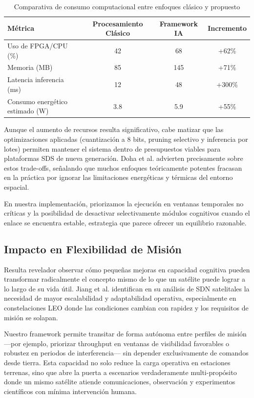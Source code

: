 \begin{table}[h]
\centering
\caption{Comparativa de consumo computacional entre enfoques clásico y propuesto}
\label{tab:consumo_computacional}
\begin{tabular}{lccc}
\hline
\textbf{Métrica} & \textbf{Procesamiento Clásico} & \textbf{Framework IA} & \textbf{Incremento} \\
\hline
Uso de FPGA/CPU (\%) & 42 & 68 & +62\% \\
Memoria (MB) & 85 & 145 & +71\% \\
Latencia inferencia (ms) & 12 & 48 & +300\% \\
Consumo energético estimado (W) & 3.8 & 5.9 & +55\% \\
\hline
\end{tabular}
\end{table}

Aunque el aumento de recursos resulta significativo, cabe matizar que las optimizaciones aplicadas (cuantización a 8 bits, pruning selectivo y inferencia por lotes) permiten mantener el sistema dentro de presupuestos viables para plataformas SDS de nueva generación. Doha et al. \cite{Doha2026} advierten precisamente sobre estos trade-offs, señalando que muchos enfoques teóricamente potentes fracasan en la práctica por ignorar las limitaciones energéticas y térmicas del entorno espacial.

En nuestra implementación, priorizamos la ejecución en ventanas temporales no críticas y la posibilidad de desactivar selectivamente módulos cognitivos cuando el enlace se encuentra estable, estrategia que parece ofrecer un equilibrio razonable.

\subsection{Impacto en Flexibilidad de Misión}

Resulta revelador observar cómo pequeñas mejoras en capacidad cognitiva pueden transformar radicalmente el concepto mismo de lo que un satélite puede lograr a lo largo de su vida útil. Jiang et al. \cite{Jiang2023} identifican en su análisis de SDN satelitales la necesidad de mayor escalabilidad y adaptabilidad operativa, especialmente en constelaciones LEO donde las condiciones cambian con rapidez y los requisitos de misión se solapan.

Nuestro framework permite transitar de forma autónoma entre perfiles de misión —por ejemplo, priorizar throughput en ventanas de visibilidad favorables o robustez en periodos de interferencia— sin depender exclusivamente de comandos desde tierra. Esta capacidad no solo reduce la carga operativa en estaciones terrenas, sino que abre la puerta a escenarios verdaderamente multi-propósito donde un mismo satélite atiende comunicaciones, observación y experimentos científicos con mínima intervención humana.

